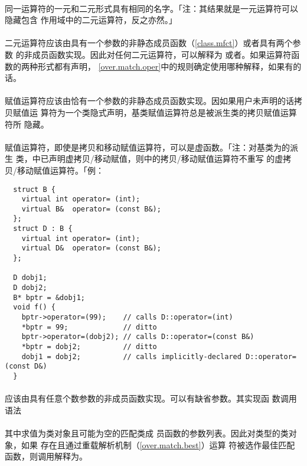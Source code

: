 \paragraph{}
同一运算符的一元和二元形式具有相同的名字。「注：其结果就是一元运算符可以隐藏包含
作用域中的二元运算符，反之亦然。」

\paragraph{}
二元运算符应该由具有一个参数的非静态成员函数（\ref{class.mfct}）或者具有两个参数
的非成员函数实现。因此对任何二元运算符，可以解释为
或者。如果运算符函数的两种形式都有声明，
\ref{over.match.oper}中的规则确定使用哪种解释，如果有的话。

\paragraph{}
赋值运算符应该由恰有一个参数的非静态成员函数实现。因如果用户未声明的话拷贝赋值运
算符为一个类隐式声明，基类赋值运算符总是被派生类的拷贝赋值运算符所
隐藏。

\paragraph{}
赋值运算符，即使是拷贝和移动赋值运算符，可以是虚函数。「注：对基类为的派生
类，中已声明虚拷贝/移动赋值，则中的拷贝/移动赋值运算符不重写
的虚拷贝/移动赋值运算符。「例：
\begin{lstlisting}
  struct B {
    virtual int operator= (int);
    virtual B&  operator= (const B&);
  };
  struct D : B {
    virtual int operator= (int);
    virtual D&  operator= (const B&);
  };

  D dobj1;
  D dobj2;
  B* bptr = &dobj1;
  void f() {
    bptr->operator=(99);    // calls D::operator=(int)
    *bptr = 99;             // ditto
    bptr->operator=(dobj2); // calls D::operator=(const B&)
    *bptr = dobj2;          // ditto
    dobj1 = dobj2;          // calls implicitly-declared D::operator=(const D&)
  }
\end{lstlisting}

\paragraph{}
应该由具有任意个数参数的非成员函数实现。可以有缺省参数。其实现函
数调用语法                                                                    \\
\mbox{}                                                                    \\
其中求值为类对象且可能为空的匹配类成
员函数的参数列表。因此对类型的类对象，如果
存在且通过重载解析机制（\ref{over.match.best}）运算
符被选作最佳匹配函数，则调用解释为。


